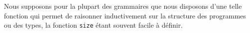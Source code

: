 Nous supposons pour la plupart des grammaires que nous disposons d'une telle
fonction qui permet de raisonner inductivement sur la structure des
programmes ou des types, la fonction \verb|size| étant souvent facile à définir.


%
%
%
%
%
%
%
%
%
%
